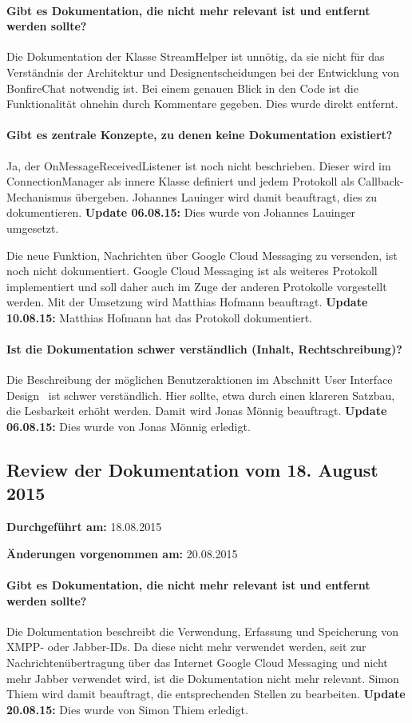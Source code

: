 \paragraph{Gibt es Dokumentation, die nicht mehr relevant ist und entfernt werden sollte?}
Die Dokumentation der Klasse StreamHelper ist unnötig, da sie nicht für das Verständnis der Architektur und Designentscheidungen bei der Entwicklung von BonfireChat notwendig ist. Bei einem genauen Blick in den Code ist die Funktionalität ohnehin durch Kommentare gegeben. Dies wurde direkt entfernt.

\paragraph{Gibt es zentrale Konzepte, zu denen keine Dokumentation existiert?}
Ja, der OnMessageReceivedListener ist noch nicht beschrieben. Dieser wird im ConnectionManager als innere Klasse definiert und jedem Protokoll als Callback-Mechanismus übergeben. Johannes Lauinger wird damit beauftragt, dies zu dokumentieren. \textbf{Update 06.08.15:} Dies wurde von Johannes Lauinger umgesetzt.

Die neue Funktion, Nachrichten über Google Cloud Messaging zu versenden, ist noch nicht dokumentiert. Google Cloud Messaging ist als weiteres Protokoll implementiert und soll daher auch im Zuge der anderen Protokolle vorgestellt werden. Mit der Umsetzung wird Matthias Hofmann beauftragt. \textbf{Update 10.08.15:} Matthias Hofmann hat das Protokoll dokumentiert.

\paragraph{Ist die Dokumentation schwer verständlich (Inhalt, Rechtschreibung)?}
Die Beschreibung der möglichen Benutzeraktionen im Abschnitt \glqq User Interface Design\grqq~ ist schwer verständlich. Hier sollte, etwa durch einen klareren Satzbau, die Lesbarkeit erhöht werden. Damit wird Jonas Mönnig beauftragt. \textbf{Update 06.08.15:} Dies wurde von Jonas Mönnig erledigt.


\subsection{Review der Dokumentation vom 18. August 2015}

\textbf{Durchgeführt am:} 18.08.2015

\textbf{Änderungen vorgenommen am:} 20.08.2015

\paragraph{Gibt es Dokumentation, die nicht mehr relevant ist und entfernt werden sollte?}
Die Dokumentation beschreibt die Verwendung, Erfassung und Speicherung von XMPP- oder Jabber-IDs. Da diese nicht mehr verwendet werden, seit zur Nachrichtenübertragung über das Internet Google Cloud Messaging und nicht mehr Jabber verwendet wird, ist die Dokumentation nicht mehr relevant. Simon Thiem wird damit beauftragt, die entsprechenden Stellen zu bearbeiten. \textbf{Update 20.08.15:} Dies wurde von Simon Thiem erledigt.

